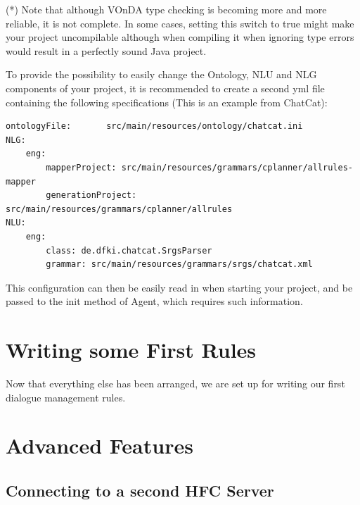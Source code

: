\documentclass[a4paper]{report}
\newcommand{\vonda}{VOnDA\xspace}
\begin{document}
(*) Note that although \vonda type checking is becoming more and more reliable, it is not complete. In some cases, setting this switch to true might make your project uncompilable although when compiling it when ignoring type errors would result in a perfectly sound Java project.

To provide the possibility to easily change the Ontology, NLU and NLG components of your project, it is recommended to create a second yml file containing the following specifications (This is an example from ChatCat):

\begin{verbatim}
ontologyFile:       src/main/resources/ontology/chatcat.ini
NLG:
	eng:
		mapperProject: src/main/resources/grammars/cplanner/allrules-mapper
		generationProject: src/main/resources/grammars/cplanner/allrules
NLU:
	eng:
		class: de.dfki.chatcat.SrgsParser
		grammar: src/main/resources/grammars/srgs/chatcat.xml
\end{verbatim}

This configuration can then be easily read in when starting your project, and be passed to the init method of Agent, which requires such information.

\section{Writing some First Rules}

Now that everything else has been arranged, we are set up for writing our first dialogue management rules. 

\section{Advanced Features}

\subsection{Connecting to a second HFC Server}
\end{document}
